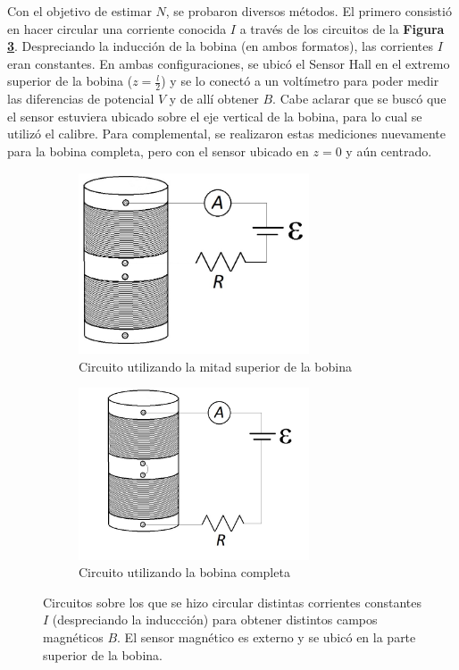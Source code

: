 \documentclass[11pt,a4paper]{article}
\begin{document}
Con el objetivo de estimar $N$, se probaron diversos métodos. El primero consistió en hacer circular una corriente conocida $I$ a través de los circuitos de la \textbf{Figura \ref{fig:circ_bob}}. Despreciando la inducción de la bobina (en ambos formatos), las corrientes $I$ eran constantes. En ambas configuraciones, se ubicó el Sensor Hall en el extremo superior de la bobina ($z = \frac{l}{2}$) y se lo conectó a un voltímetro para poder medir las diferencias de potencial $V$ y de allí obtener $B$. Cabe aclarar que se buscó que el sensor estuviera ubicado sobre el eje vertical de la bobina, para lo cual se utilizó el calibre. Para complemental, se realizaron estas mediciones nuevamente para la bobina completa, pero con el sensor ubicado en $z = 0$ y aún centrado. 

\begin{figure}[h!]
   \begin{subfigure}{0.5\textwidth}
      \centering
      \includegraphics[width=0.75\textwidth]{Circuito_Bobina_corta}
      \caption{Circuito utilizando la mitad superior de la bobina}  
      \label{subfig:bob_corta}
   \end{subfigure}
   \begin{subfigure}{0.5\textwidth}
      \centering
      \includegraphics[width=0.75\textwidth]{Circuito_Bobina_larga}
      \caption{Circuito utilizando la bobina completa}  
      \label{subfig:bob_larga}
   \end{subfigure}
   \caption{Circuitos sobre los que se hizo circular distintas corrientes constantes $I$ (despreciando la induccción) para obtener distintos campos magnéticos $B$. El sensor magnético es externo y se ubicó en la parte superior de la bobina.}
   \label{fig:circ_bob}
\end{figure}
\end{document}
